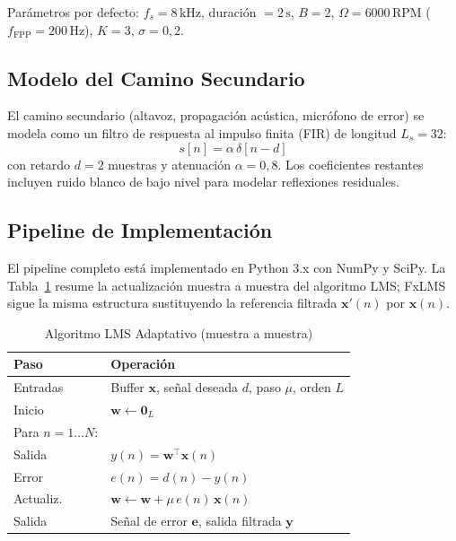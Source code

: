 \documentclass[journal,12pt,onecolumn]{IEEEtran}
\newcommand{\SI}[2]{\ensuremath{#1\,\mathrm{#2}}}
\begin{document}
Parámetros por defecto: $f_s = \SI{8}{kHz}$, duración $= \SI{2}{s}$,
$B=2$, $\Omega=\SI{6000}{RPM}$ ($f_{\text{FPP}}=\SI{200}{Hz}$),
$K=3$, $\sigma=0{,}2$.

\subsection{Modelo del Camino Secundario}

El camino secundario (altavoz, propagación acústica, micrófono de error)
se modela como un filtro de respuesta al impulso finita (FIR) de longitud
$L_s = 32$:
\begin{equation}
  s[n] = \alpha\,\delta[n - d]
  \label{eq:secpath}
\end{equation}
con retardo $d = 2$ muestras y atenuación $\alpha = 0{,}8$.
Los coeficientes restantes incluyen ruido blanco de bajo nivel para
modelar reflexiones residuales.

\subsection{Pipeline de Implementación}

El pipeline completo está implementado en Python 3.x con NumPy y SciPy.
La Tabla~\ref{alg:lms} resume la actualización muestra a muestra del
algoritmo LMS; FxLMS sigue la misma estructura sustituyendo la referencia
filtrada $\bm{x}'(n)$ por $\bm{x}(n)$.

\begin{table}[t]
  \centering
  \caption{Algoritmo LMS Adaptativo (muestra a muestra)}
  \label{alg:lms}
  \begin{tabular}{@{}ll@{}}
    \toprule
    \textbf{Paso} & \textbf{Operación} \\
    \midrule
    Entradas & Buffer $\bm{x}$, señal deseada $d$, paso $\mu$, orden $L$ \\
    Inicio   & $\bm{w} \leftarrow \bm{0}_L$ \\
    Para $n=1\ldots N$: & \\
    \quad Salida    & $y(n) = \bm{w}^\top\bm{x}(n)$ \\
    \quad Error     & $e(n) = d(n) - y(n)$ \\
    \quad Actualiz. & $\bm{w} \leftarrow \bm{w} + \mu\,e(n)\,\bm{x}(n)$ \\
    Salida & Señal de error $\bm{e}$, salida filtrada $\bm{y}$ \\
    \bottomrule
  \end{tabular}
\end{table}
\end{document}
